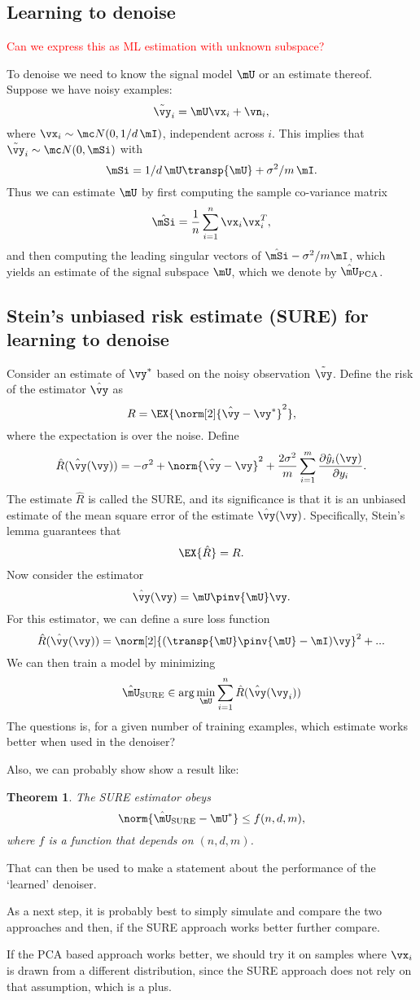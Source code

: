 \documentclass{article}
\newtheorem{theorem}{Theorem}
\newcommand\SUREest{\hat \mU_{\mathrm{SURE}}}
\newcommand\PCAest{\hat \mU_{\mathrm{PCA}}}
\begin{document}
\subsection{Learning to denoise}

\textcolor{red}{Can we express this as ML estimation with unknown subspace?}

To denoise we need to know the signal model $\mU$ or an estimate thereof. 
Suppose we have noisy examples:
\[
\tilde \vy_i = \mU \vx_i + \vn_i,
\]
where $\vx_i \sim \mc N(0, 1/d\, \mI)$, independent across $i$. 
This implies that $\tilde \vy_i \sim \mc N( 0, \mSi )$ with 
\[
\mSi = 1/d \, \mU \transp{\mU} + \sigma^2 / m \, \mI.
\]
Thus we can estimate $\mU$ by first computing the sample co-variance matrix
\[
\hat \mSi = \frac{1}{n} \sum_{i=1}^n \vx_i \vx_i^T,
\]
and then computing the leading singular vectors of $\hat \mSi - \sigma^2 / m \mI$, which yields an estimate of the signal subspace $\mU$, which we denote by $\PCAest$.

\subsection{Stein's unbiased risk estimate (SURE) for learning to denoise}

Consider an estimate of $\vy^\ast$ based on the noisy observation $\tilde \vy$. 
Define the risk of the estimator $\hat \vy$ as 
\[
R = \EX{\norm[2]{\hat \vy - \vy^\ast}^2},
\]
where the expectation is over the noise. 
Define 
\[
\hat R( \hat \vy(\vy) ) = - \sigma^2 + \norm{\hat \vy - \vy}^2
+ \frac{2 \sigma^2}{m} \sum_{i=1}^m \frac{\partial \hat y_i(\vy)}{\partial y_i}.
\]
The estimate $\hat R$ is called the SURE, and its significance is that it is an unbiased estimate of the mean square error of the estimate $\hat \vy(\vy)$. 
Specifically, Stein's lemma guarantees that
\[
\EX{\hat R} = R. 
\]
Now consider the estimator 
\[
\hat \vy(\vy) = \mU \pinv{\mU} \vy.
\]
For this estimator, we can define a sure loss function
\[
\hat R( \hat \vy(\vy) ) =  \norm[2]{ (\transp{\mU} \pinv{\mU} - \mI)\vy}^2
+ ...
\]
We can then train a model by minimizing
\[
\SUREest \in \arg \min_\mU 
\sum_{i=1}^n \hat R( \hat \vy(\vy_i) )
\]
The questions is, for a given number of training examples, which estimate works better when used in the denoiser?

Also, we can probably show show a result like:
\begin{theorem}
The SURE estimator obeys 
\[
\norm{\SUREest - \mU^\ast} \leq f(n,d,m),
\]
where $f$ is a function that depends on $(n,d,m)$.
\end{theorem}

That can then be used to make a statement about the performance of the `learned' denoiser.


As a next step, it is probably best to simply simulate and compare the two approaches and then, if the SURE approach works better further compare.

If the PCA based approach works better, we should try it on samples where $\vx_i$ is drawn from a different distribution, since the SURE approach does not rely on that assumption, which is a plus.
\end{document}
